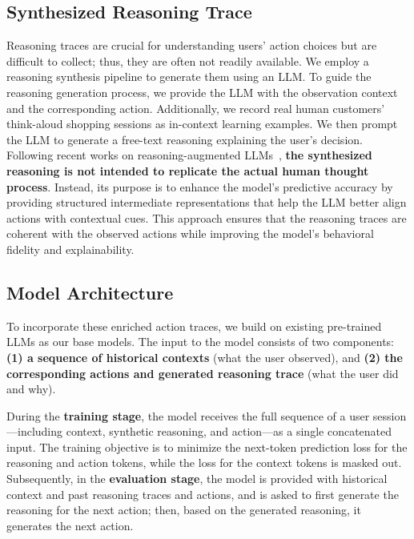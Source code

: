 \documentclass{article} %
\begin{document}
\subsection{Synthesized Reasoning Trace}
\label{sec:data-synthesize}
Reasoning traces are crucial for understanding users' action choices but are difficult to collect; thus, they are often not readily available.
We employ a reasoning synthesis pipeline to generate them using an LLM.
To guide the reasoning generation process, we provide the LLM with the observation context and the corresponding action.
Additionally, we record real human customers' think-aloud shopping sessions \cite{ecclesThinkAloudMethod2017} as in-context learning examples.
We then prompt the LLM to generate a free-text reasoning explaining the user's decision.
Following recent works on reasoning-augmented LLMs~\cite{weiChainofThoughtPromptingElicits2023,deepseek-aiDeepSeekR1IncentivizingReasoning2025}, \textbf{the synthesized reasoning is not intended to replicate the actual human thought process}. Instead, its purpose is to enhance the model's predictive accuracy by providing structured intermediate representations that help the LLM better align actions with contextual cues.
This approach ensures that the reasoning traces are coherent with the observed actions while improving the model's behavioral fidelity and explainability.

\subsection{Model Architecture}

To incorporate these enriched action traces, we build on existing pre-trained LLMs as our base models.
The input to the model consists of two components: \textbf{(1) a sequence of historical contexts} (what the user observed), and \textbf{(2) the corresponding actions and generated reasoning trace} (what the user did and why).

During the \textbf{training stage}, the model receives the full sequence of a user session—including context, synthetic reasoning, and action—as a single concatenated input. 
The training objective is to minimize the next-token prediction loss for the reasoning and action tokens, while the loss for the context tokens is masked out. 
Subsequently, in the \textbf{evaluation stage}, the model is provided with historical context and past reasoning traces and actions, and is asked to first generate the reasoning for the next action; then, based on the generated reasoning, it generates the next action.
\end{document}
